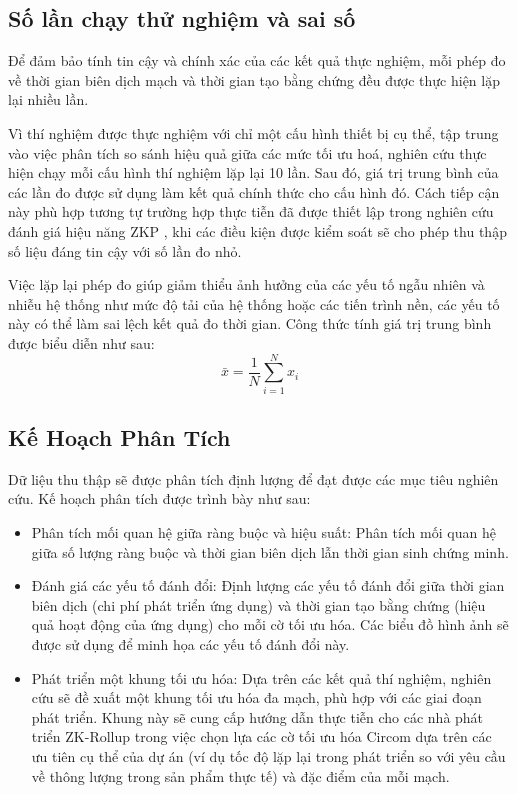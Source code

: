 \subsection{Số lần chạy thử nghiệm và sai số}
Để đảm bảo tính tin cậy và chính xác của các kết quả thực nghiệm, mỗi phép đo về thời gian biên dịch mạch và thời gian tạo bằng chứng đều được thực hiện lặp lại nhiều lần.

Vì thí nghiệm được thực nghiệm với chỉ một cấu hình thiết bị cụ thể, tập trung vào việc phân tích so sánh hiệu quả giữa các mức tối ưu hoá, nghiên cứu thực hiện chạy mỗi cấu hình thí nghiệm lặp lại 10 lần. Sau đó, giá trị trung bình của các lần đo được sử dụng làm kết quả chính thức cho cấu hình đó. Cách tiếp cận này phù hợp tương tự trường hợp thực tiễn đã được thiết lập trong nghiên cứu đánh giá hiệu năng ZKP \cite{ernstberger2024zk}, khi các điều kiện được kiểm soát sẽ cho phép thu thập số liệu đáng tin cậy với số lần đo nhỏ.

Việc lặp lại phép đo giúp giảm thiểu ảnh hưởng của các yếu tố ngẫu nhiên và nhiễu hệ thống như mức độ tải của hệ thống hoặc các tiến trình nền, các yếu tố này có thể làm sai lệch kết quả đo thời gian.
Công thức tính giá trị trung bình được biểu diễn như sau:
\[
\bar{x} = \frac{1}{N} \sum_{i=1}^{N} x_i
\]


\subsection{Kế Hoạch Phân Tích}
Dữ liệu thu thập sẽ được phân tích định lượng để đạt được các mục tiêu nghiên cứu. Kế hoạch phân tích được trình bày như sau:
\begin{itemize}
    \item Phân tích mối quan hệ giữa ràng buộc và hiệu suất: Phân tích mối quan hệ giữa số lượng ràng buộc và thời gian biên dịch lẫn thời gian sinh chứng minh.
    \item Đánh giá các yếu tố đánh đổi: Định lượng các yếu tố đánh đổi giữa thời gian biên dịch (chi phí phát triển ứng dụng) và thời gian tạo bằng chứng (hiệu quả hoạt động của ứng dụng) cho mỗi cờ tối ưu hóa. Các biểu đồ hình ảnh sẽ được sử dụng để minh họa các yếu tố đánh đổi này.
    \item Phát triển một khung tối ưu hóa: Dựa trên các kết quả thí nghiệm, nghiên cứu sẽ đề xuất một khung tối ưu hóa đa mạch, phù hợp với các giai đoạn phát triển. Khung này sẽ cung cấp hướng dẫn thực tiễn cho các nhà phát triển ZK-Rollup trong việc chọn lựa các cờ tối ưu hóa Circom dựa trên các ưu tiên cụ thể của dự án (ví dụ tốc độ lặp lại trong phát triển so với yêu cầu về thông lượng trong sản phẩm thực tế) và đặc điểm của mỗi mạch.
\end{itemize}

